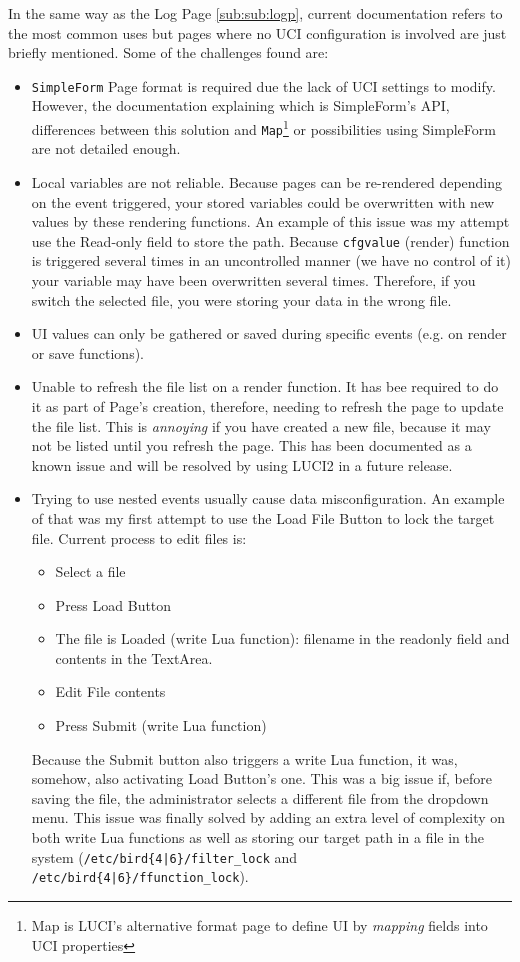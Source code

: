In the same way as the Log Page \ref{sub:sub:logp}, current documentation refers to the most common uses but pages where no UCI configuration is involved are just briefly mentioned. Some of the challenges found are:
\begin{itemize}
    \item \texttt{SimpleForm} Page format is required due the lack of UCI settings to modify. However, the documentation explaining which is SimpleForm's API, differences between this solution and \texttt{Map}\footnote{Map is LUCI's alternative format page to define UI by \textit{mapping} fields into UCI properties} or possibilities using SimpleForm are not detailed enough.
    \item Local variables are not reliable. Because pages can be re-rendered depending on the event triggered, your stored variables could be overwritten with new values by these rendering functions.
    An example of this issue was my attempt use the Read-only field to store the path. Because \texttt{cfgvalue} (render) function is triggered several times in an uncontrolled manner (we have no control of it) your variable may have been overwritten several times. Therefore, if you switch the selected file, you were storing your data in the wrong file.
    \item UI values can only be gathered or saved during specific events (e.g. on render or save functions).
    \item Unable to refresh the file list on a render function. It has bee required to do it as part of Page's creation, therefore, needing to refresh the page to update the file list. This is \textit{annoying} if you have created a new file, because it may not be listed until you refresh the page.
    This has been documented as a known issue and will be resolved by using LUCI2 in a future release. 
    \item Trying to use nested events usually cause data misconfiguration.
    An example of that was my first attempt to use the Load File Button to lock the target file. Current process to edit files is: 
    \begin{itemize}
        \item Select a file
        \item Press Load Button
        \item The file is Loaded (write Lua function): filename in the readonly field and contents in the TextArea.
        \item Edit File contents
        \item Press Submit (write Lua function)
    \end{itemize}
    Because the Submit button also triggers a write Lua function, it was, somehow, also activating Load Button's one. This was a big issue if, before saving the file, the administrator selects a different file from the dropdown menu.
    This issue was finally solved by adding an extra level of complexity on both write Lua functions as well as storing our target path in a file in the system (\texttt{/etc/bird\{4|6\}/filter\_lock} and \texttt{/etc/bird\{4|6\}/ffunction\_lock}).
\end{itemize}



